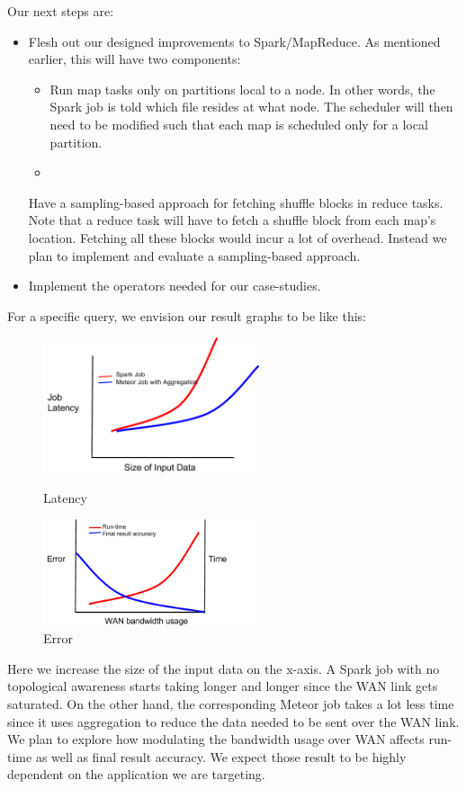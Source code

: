 Our next steps are:

\begin{itemize}
\item Flesh out our designed improvements to Spark/MapReduce. As mentioned earlier, this will have two components:
\begin{itemize}
\item Run map tasks only on partitions local to a node. In other words, the Spark job is told which file resides at what node. The scheduler will then need to be modified such that each map is scheduled only for a local partition.
\item    
\end{itemize} Have a sampling-based approach for fetching shuffle blocks in reduce tasks. Note that a reduce task will have to fetch a shuffle block from each map's location. Fetching all these blocks would incur a lot of overhead. Instead we plan to implement and evaluate a sampling-based approach.
\item Implement the operators needed for our case-studies.
\end{itemize}

For a specific query, we envision our result graphs to be like this:

\begin{figure}[ht]
	\centering
	\begin{minipage}[b]{0.48\linewidth}
		\includegraphics[width=2.5in]{figs/fig_1.png}
		\caption{Latency}
		\label{fig:minipage1}
	\end{minipage}
	\quad
	\begin{minipage}[b]{0.48\linewidth}
		\includegraphics[width=2.5in]{figs/fig_2.png}
		\caption{Error}
		\label{fig:minipage2}
	\end{minipage}
\end{figure}

Here we increase the size of the input data on the x-axis. A Spark job with no topological awareness starts taking longer and longer since the WAN link gets saturated. On the other hand, the corresponding Meteor job takes a lot less time since it uses aggregation to reduce the data needed to be sent over the WAN link. We plan to explore how modulating the bandwidth usage over WAN affects run-time as well as final result accuracy. We expect those result to be highly dependent on the application we are targeting.